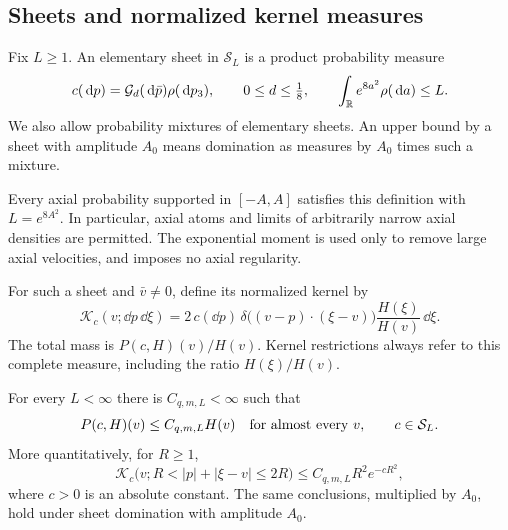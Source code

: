 \subsection{Sheets and normalized kernel measures}

\begin{definition}\label{ker:sheet-class}
Fix $L\geq1$. An elementary sheet in $\mathcal S_L$ is a product
probability measure
\begin{equation}\label{ker:sheet-definition}
 c(\,\mathrm d p)=\mathcal G_d(\,\mathrm d\bar p)\rho(\,\mathrm d p_3),\qquad
 0\leq d\leq\tfrac18,\qquad
 \int_{\mathbb R}e^{8a^2}\rho(\,\mathrm d a)\leq L.
\end{equation}
We also allow probability mixtures of elementary sheets. An upper
bound by a sheet with amplitude $A_0$ means domination as measures by
$A_0$ times such a mixture.
\end{definition}

Every axial probability supported in $[-A,A]$ satisfies this
definition with $L=e^{8A^2}$. In particular, axial atoms and limits of
arbitrarily narrow axial densities are permitted. The exponential
moment is used only to remove large axial velocities, and imposes no
axial regularity.

For such a sheet and $\bar v\ne0$, define its normalized kernel by
\begin{equation}\label{ker:normalized-kernel}
 \mathcal K_c(v;\dd p\,\dd\xi)
 =2\,c(\dd p)\,
       \delta\bigl((v-p)\cdot(\xi-v)\bigr)
       \frac{H(\xi)}{H(v)}\,\dd\xi.
\end{equation}
The total mass is $P(c,H)(v)/H(v)$. Kernel restrictions always refer
to this complete measure, including the ratio $H(\xi)/H(v)$.

\begin{lemma}\label{lem:sheet-bound}
For every $L<\infty$ there is $C_{q,m,L}<\infty$ such that
\begin{equation}\label{ker:sheet-gain}
 P(c,H)(v)\leq C_{q,m,L}H(v)
 \quad\hbox{for almost every }v,
 \qquad c\in\mathcal S_L.
\end{equation}
More quantitatively, for $R\geq1$,
\begin{equation}\label{ker:shell-tail}
 \mathcal K_c\bigl(v;
      R<|p|+|\xi-v|\leq2R\bigr)
 \leq C_{q,m,L}R^2e^{-cR^2},
\end{equation}
where $c>0$ is an absolute constant. The same conclusions, multiplied
by $A_0$, hold under sheet domination with amplitude $A_0$.
\end{lemma}

